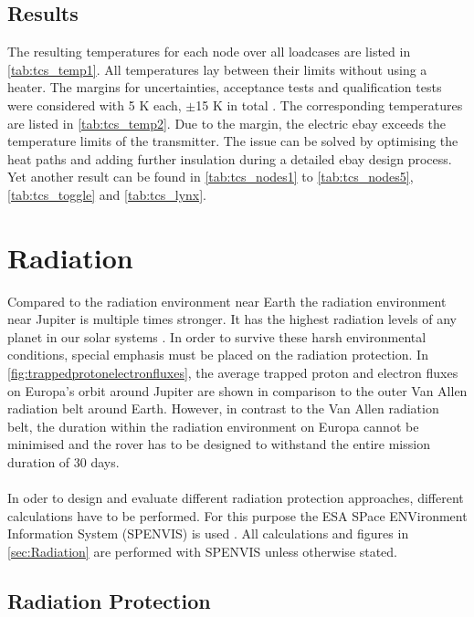 \subsection{Results}
The resulting temperatures for each node over all loadcases  are listed in \autoref{tab:tcs_temp1}.
All temperatures lay between their limits without using a heater.
The margins for uncertainties, acceptance tests and qualification tests were considered with 5 K each, $\pm$15 K in total \cite{ref_tcs_05}.
The corresponding temperatures are listed in \autoref{tab:tcs_temp2}.
Due to the margin, the electric ebay exceeds the temperature limits of the transmitter.
The issue can be solved by optimising the heat paths and adding further insulation during a detailed ebay design process.
Yet another result can be found in \autoref{tab:tcs_nodes1} to \autoref{tab:tcs_nodes5}, \autoref{tab:tcs_toggle} and  \autoref{tab:tcs_lynx}.

\section{Radiation} \label{sec:Radiation}

Compared to the radiation environment near Earth the radiation environment near Jupiter is multiple times stronger. It has the highest radiation levels of any planet in our solar systems \cite{JupiterRadiationEnvironment}. In order to survive these harsh environmental conditions, special emphasis must be placed on the radiation protection. In \autoref{fig:trappedprotonelectronfluxes}, the average trapped proton and electron fluxes on Europa's orbit around Jupiter are shown in comparison to the outer Van Allen radiation belt around Earth. However, in contrast to the Van Allen radiation belt, the duration within the radiation environment on Europa cannot be minimised and the rover has to be designed to withstand the entire mission duration of 30 days. \\ \\
In oder to design and evaluate different radiation protection approaches, different calculations have to be performed. For this purpose the ESA SPace ENVironment Information System (SPENVIS) is used \cite{Spenvis}. All calculations and figures in \autoref{sec:Radiation} are performed with SPENVIS unless otherwise stated.

\subsection{Radiation Protection}

